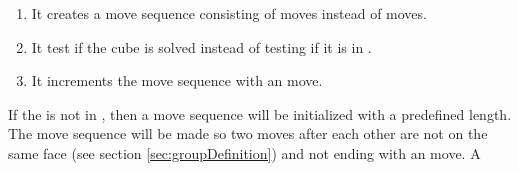 \begin{enumerate}
	\item It creates a move sequence consisting of  moves instead of  moves.
	\item It test if the cube is solved instead of testing if it is in .
	\item It increments the move sequence with an  move.
\end{enumerate} 

If the \rubik{} is not in , then a move sequence will be initialized with a predefined length.
The move sequence will be made so two moves after each other are not on the same face (see section \ref{sec:groupDefinition}) and not ending with an  move.
A  


